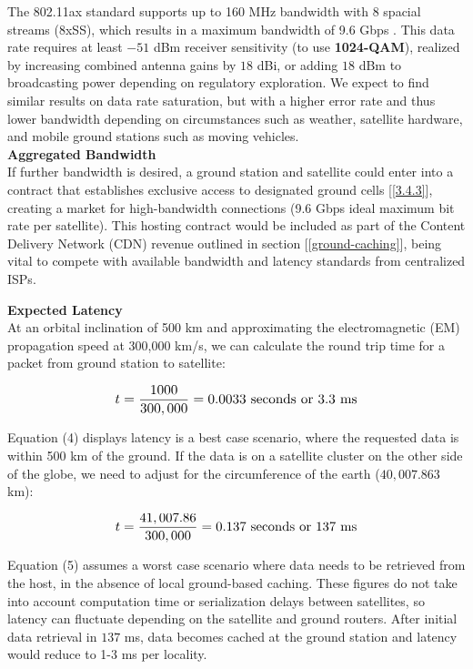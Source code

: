 \documentclass[11pt]{article}
\begin{document}
\noindent The 802.11ax standard supports up to 160 MHz bandwidth with 8 spacial streams (8xSS), which results in a maximum bandwidth of 9.6 Gbps \cite{MCS-Table}.
This data rate requires at least $-51$ dBm receiver sensitivity (to use \textbf{1024-QAM}), realized by increasing combined antenna gains by $18$ dBi, or adding $18$ dBm to broadcasting power depending on regulatory exploration.
We expect to find similar results on data rate saturation, but with a higher error rate and thus lower bandwidth depending on circumstances such as weather, satellite hardware, and mobile ground stations such as moving vehicles. \\


{\noindent\textbf{Aggregated Bandwidth}} \\

\noindent If further bandwidth is desired, a ground station and satellite could enter into a contract that establishes exclusive access to designated ground cells [\ref{3.4.3}], creating a market for high-bandwidth connections (9.6 Gbps ideal maximum bit rate per satellite).
This hosting contract would be included as part of the Content Delivery Network (CDN) revenue outlined in section [\ref{ground-caching}], being vital to compete with available bandwidth and latency standards from centralized ISPs.

\bigskip
{\noindent\textbf{Expected Latency}} \\

\noindent At an orbital inclination of 500 km and approximating the electromagnetic (EM) propagation speed at 300,000 km/s, we can calculate the round trip time for a packet from ground station to satellite:

\begin{equation}
\resizebox{.55\hsize}{!}{$t = \mathlarger{\frac{1000}{300,000}} = 0.0033 $ seconds or $3.3 $ ms}
\end{equation}

\noindent Equation (4) displays latency is a best case scenario, where the requested data is within 500 km of the ground.
If the data is on a satellite cluster on the other side of the globe, we need to adjust for the circumference of the earth ($40,007.863$ km):

\begin{equation}
\resizebox{.55\hsize}{!}{$t = \mathlarger{\frac{41,007.86}{300,000}} = 0.137 $ seconds or $137 $ ms}
\end{equation}

\noindent Equation (5) assumes a worst case scenario where data needs to be retrieved from the host, in the absence of local ground-based caching.
These figures do not take into account computation time or serialization delays between satellites, so latency can fluctuate depending on the satellite and ground routers.
After initial data retrieval in $137$ ms, data becomes cached at the ground station and latency would reduce to 1-3 ms per locality.
\end{document}
